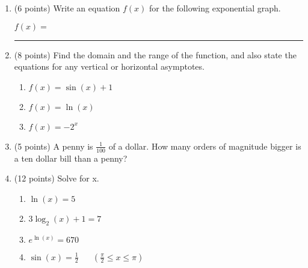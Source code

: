 \documentclass[11pt]{article}
\begin{document}
\begin{enumerate}
\newpage


\item (6 points) Write an equation $f(x)$ for the following exponential graph.
\vspace{10pt}
\begin{center}
\end{center}

\begin{flushright}
$f(x) =$ \rule{4cm}{0.4pt}
\end{flushright}


\item (8 points) Find the domain and the range of the function, and also state the equations for any vertical or horizontal asymptotes.
\begin{enumerate}[itemsep=60pt]
    \item $f(x) = \sin(x)+1$
    \item $f(x) = \ln(x)$
    \item $f(x) = -2^x$
\end{enumerate}
\vspace{60pt}


\item (5 points) A penny is $\frac{1}{100}$ of a dollar. How many orders of magnitude bigger is a ten dollar bill than a penny?
\vspace{20pt}


\newpage



\item (12 points) Solve for x.
\begin{multicols}{2}
\begin{enumerate}[itemsep=50pt]
    \item $\ln(x) = 5$
    \item $3\log_{2}(x) + 1 = 7$
    \item $e^{\ln(x)}=670$
    \item $\sin(x)=\frac{1}{2} \hspace{20pt} (\frac{\pi}{2} \leq x \leq \pi)$
\end{enumerate}
\end{multicols}
\vspace{50pt}



\end{enumerate}
\end{document}
